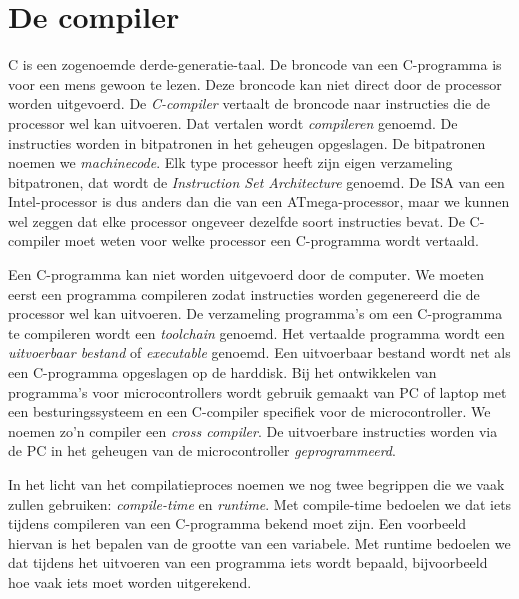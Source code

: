 \section{De compiler}
C is een zogenoemde derde-generatie-taal. De broncode van een C-programma is voor een mens gewoon te lezen. Deze broncode kan niet direct door de processor worden uitgevoerd. De \textsl{C-compiler} vertaalt de broncode naar instructies die de processor wel kan uitvoeren. Dat vertalen wordt \textsl{compileren} genoemd. De instructies worden in bitpatronen in het geheugen opgeslagen. De bitpatronen noemen we \textsl{machinecode}. Elk type processor heeft zijn eigen verzameling bitpatronen, dat wordt de \textsl{Instruction Set Architecture} genoemd. De ISA van een Intel-processor is dus anders dan die van een ATmega-processor, maar we kunnen wel zeggen dat elke processor ongeveer dezelfde soort instructies bevat. De C-compiler moet weten voor welke processor een C-programma wordt vertaald.

Een C-programma kan niet worden uitgevoerd door de computer. We moeten eerst een programma compileren zodat instructies worden gegenereerd die de processor wel kan uitvoeren. De verzameling programma's om een C-programma te compileren wordt een \textsl{toolchain} genoemd. Het vertaalde programma wordt een \textsl{uitvoerbaar bestand} of \textsl{executable} genoemd. Een uitvoerbaar bestand wordt net als een C-programma opgeslagen op de harddisk. Bij het ontwikkelen van programma's voor microcontrollers wordt gebruik gemaakt van PC of laptop met een besturingssysteem en een C-compiler specifiek voor de microcontroller. We noemen zo'n compiler een \textsl{cross compiler}. De uitvoerbare instructies worden via de PC in het geheugen van de microcontroller \textsl{geprogrammeerd}.

In het licht van het compilatieproces noemen we nog twee begrippen die we vaak zullen gebruiken: \textsl{compile-time} en \textsl{runtime}. Met compile-time bedoelen we dat iets tijdens compileren van een C-programma bekend moet zijn. Een voorbeeld hiervan is het bepalen van de grootte van een variabele. Met runtime bedoelen we dat tijdens het uitvoeren van een programma iets wordt bepaald, bijvoorbeeld hoe vaak iets moet worden uitgerekend.

